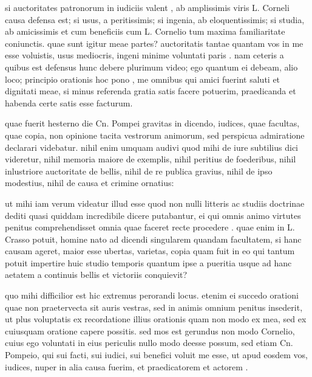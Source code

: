 
 si auctoritates patronorum in iudiciis valent , ab amplissimis viris L. Corneli causa defensa est; si usus, a peritissimis; si ingenia, ab eloquentissimis; si studia, ab amicissimis et cum beneficiis cum L. Cornelio tum maxima familiaritate coniunctis. quae sunt igitur meae partes? auctoritatis tantae quantam vos in me esse voluistis, usus mediocris, ingeni minime voluntati paris . nam ceteris a quibus est defensus hunc debere plurimum video; ego quantum ei debeam, alio loco; principio orationis hoc pono , me omnibus qui amici fuerint saluti et dignitati meae, si minus referenda gratia satis facere potuerim, praedicanda et habenda certe satis esse facturum.

 quae fuerit hesterno die Cn. Pompei gravitas in dicendo, iudices, quae facultas, quae copia, non opinione tacita vestrorum animorum, sed perspicua admiratione declarari videbatur. nihil enim umquam audivi quod mihi de iure subtilius dici videretur, nihil memoria maiore de exemplis, nihil peritius de foederibus, nihil inlustriore auctoritate de bellis, nihil de re publica gravius, nihil de ipso modestius, nihil de causa et crimine ornatius:

 ut mihi iam verum videatur illud esse quod non nulli litteris ac studiis doctrinae dediti quasi quiddam incredibile dicere putabantur, ei qui omnis animo virtutes penitus comprehendisset omnia quae faceret recte procedere . quae enim in L. Crasso potuit, homine nato ad dicendi singularem quandam facultatem, si hanc causam ageret, maior esse ubertas, varietas, copia quam fuit in eo qui tantum potuit impertire huic studio temporis quantum ipse a pueritia usque ad hanc aetatem a continuis bellis et victoriis conquievit?

 quo mihi difficilior est hic extremus perorandi locus. etenim ei succedo orationi quae non praetervecta sit auris vestras, sed in animis omnium penitus insederit, ut plus voluptatis ex recordatione illius orationis quam non modo ex mea, sed ex cuiusquam oratione capere possitis. sed mos est gerundus non modo Cornelio, cuius ego voluntati in eius periculis nullo modo deesse possum, sed etiam Cn. Pompeio, qui sui facti, sui iudici, sui benefici voluit me esse, ut apud eosdem vos, iudices, nuper in alia causa fuerim, et praedicatorem et actorem .

